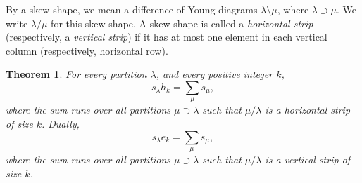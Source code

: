 \documentclass[11pt]{amsart}
\newtheorem{theorem}{Theorem}[subsection]
\theoremstyle{definition}
\theoremstyle{example}
\begin{document}
By a skew-shape, we mean a difference of Young diagrams $\lambda \setminus \mu$, where $\lambda \supset \mu$.
We write $\lambda/\mu$ for this skew-shape.
A skew-shape is called a \emph{horizontal strip} (respectively, a \emph{vertical strip}) if it has at most one element in each vertical column (respectively, horizontal row).
\begin{theorem}
  For every partition $\lambda$, and every positive integer $k$,
  \begin{displaymath}
    s_\lambda h_k = \sum_\mu s_\mu,
  \end{displaymath}
  where the sum runs over all partitions $\mu\supset\lambda$ such that $\mu/\lambda$ is a horizontal strip of size $k$.
  Dually,
  \begin{displaymath}
    s_\lambda e_k = \sum_\mu s_\mu,
  \end{displaymath}
  where the sum runs over all partitions $\mu\supset\lambda$ such that $\mu/\lambda$ is a vertical strip of size $k$.
\end{theorem}
\end{document}
